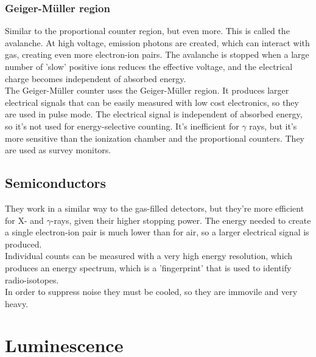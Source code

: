 \subsubsection{Geiger-Müller region}
Similar to the proportional counter region, but even more. This is called the avalanche. At high voltage, emission photons are created, which can interact with gas, creating even more electron-ion pairs. The avalanche is stopped when a large number of 'slow' positive ions reduces the effective voltage, and the electrical charge becomes independent of absorbed energy.\\
The Geiger-Müller counter uses the Geiger-Müller region. It produces larger electrical signals that can be easily measured with low cost electronics, so they are used in pulse mode. The electrical signal is independent of absorbed energy, so it's not used for energy-selective counting. It's inefficient for $\gamma$ rays, but it's more sensitive than the ionization chamber and the proportional counters. They are used as survey monitors.

\subsection{Semiconductors}
They work in a similar way to the gas-filled detectors, but they're more efficient for X- and $\gamma$-rays, given their higher stopping power. The energy needed to create a single electron-ion pair is much lower than for air, so a larger electrical signal is produced.\\
Individual counts can be measured with a very high energy resolution, which produces an energy spectrum, which is a 'fingerprint' that is used to identify radio-isotopes.\\
In order to suppress noise they must be cooled, so they are immovile and very heavy.

\section{Luminescence}
